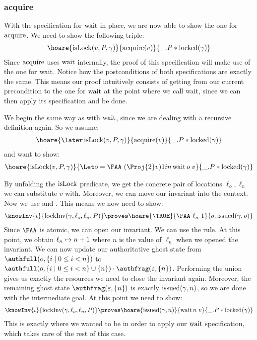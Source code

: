 \subsubsection{acquire}
With the specification for $\operatorname{wait}$ in place, we are now able to show the one for $\operatorname{acquire}$. We need to show the following triple:
\begin{align*}
  \hoare{\isLock(v, P, \gamma)}{\acquire (v)}{\_.P \ast \locked(\gamma)}
\end{align*}
Since $\operatorname{acquire}$ uses $\operatorname{wait}$ internally, the proof of this specification will make use of the one for $\operatorname{wait}$. Notice how the postconditions of both specifications are exactly the same. This means our proof intuitively consists of getting from our current precondition to the one for $\operatorname{wait}$ at the point where we call wait, since we can then apply its specification and be done.

We begin the same way as with $\operatorname{wait}$, since we are dealing with a recursive definition again. So we assume:
\begin{align*}
  \hoare{\later \isLock(v, P, \gamma)}{\acquire (v)}{\_.P \ast \locked(\gamma)}
\end{align*}
and want to show:
\begin{align*}
  \hoare{\isLock(v, P, \gamma)}{\Let o = \FAA\ (\Proj{2} v) 1 in \wait o \; v}{\_.P \ast \locked(\gamma)}
\end{align*}

By unfolding the $\operatorname{isLock}$ predicate, we get the concrete pair of locations $\ell_{o}, \ell_{n}$ we can substitute $v$ with. Moreover, we can move our invariant into the context. Now we use  and . This means we now need to show:
\begin{align*}
  \knowInv{\iota}{\lockInv (\gamma, \ell_{o}, \ell_{n}, P)}\proves \hoare{\TRUE}{\FAA\ \ell_{n}\ 1}{o. \issued (\gamma, o)}
\end{align*}
Since $\FAA$ is atomic, we can open our invariant.
We can use the  rule.
At this point, we obtain $\ell_{n} \mapsto n + 1$ where $n$ is the value of $\ell_{n}$ when we opened the invariant. We can now update our authoritative ghost state from $\authfull (o, \{ i \mid 0 \leq i < n \})$ to $\authfull (o, \{ i \mid 0 \leq i < n \} \cup \{n \}) \cdot \authfrag (\epsilon, \{n\})$.
Performing the union gives us exactly the resources we need to close the invariant again. Moreover, the remaining ghost state $\authfrag (\epsilon, \{n\})$ is exactly $\operatorname{issued} (\gamma, n)$, so we are done with the intermediate goal. At this point we need to show:
\begin{align*}
  \knowInv{\iota}{\lockInv (\gamma, \ell_{o}, \ell_{n}, P)}\proves \hoare{\issued (\gamma, n)}{\wait n \; v}{\_.P \ast \locked(\gamma)}
\end{align*}
This is exactly where we wanted to be in order to apply our $\operatorname{wait}$ specification, which takes care of the rest of this case.

